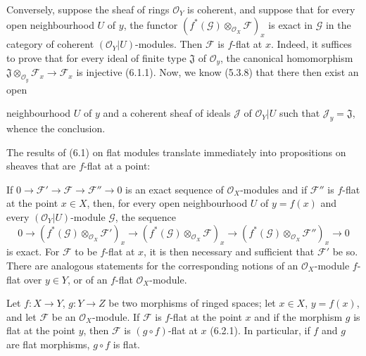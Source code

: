 \begin{env}[6.7.3]
\label{0.6.7.3}
Conversely, suppose the sheaf of rings $\mathcal O_Y$ is coherent, and
suppose that for every open neighbourhood $U$ of $y$, the functor
$(f^*(\mathcal G)\otimes_{\mathcal O_X}\mathcal F)_x$ is exact in
$\mathcal G$ in the category of coherent $(\mathcal O_Y|U)$-modules.
Then $\mathcal F$ is $f$-flat at $x$. Indeed, it suffices to prove that
for every ideal of finite type $\mathfrak J$ of $\mathcal O_y$,
the canonical homomorphism
$\mathfrak J\otimes_{\mathcal O_y}\mathcal F_x\to\mathcal F_x$ is injective
(6.1.1). Now, we know (5.3.8) that there then exist an open


neighbourhood $U$ of $y$ and a coherent sheaf of ideals $\mathcal J$ of
$\mathcal O_Y|U$ such that $\mathcal J_y=\mathfrak J$, whence the conclusion.
\end{env}

\begin{env}[6.7.4]
\label{0.6.7.4}
The results of (6.1) on flat modules translate immediately into
propositions on sheaves that are $f$-flat at a point:

If $0\to\mathcal F'\to\mathcal F\to\mathcal F''\to0$ is an exact sequence
of $\mathcal O_X$-modules and if $\mathcal F''$ is $f$-flat at the point
$x\in X$, then, for every open neighbourhood $U$ of $y=f(x)$ and every
$(\mathcal O_Y|U)$-module $\mathcal G$, the sequence
\[
  0\longrightarrow
  (f^*(\mathcal G)\otimes_{\mathcal O_X}\mathcal F')_x
  \longrightarrow
  (f^*(\mathcal G)\otimes_{\mathcal O_X}\mathcal F)_x
  \longrightarrow
  (f^*(\mathcal G)\otimes_{\mathcal O_X}\mathcal F'')_x
  \longrightarrow0
\]
is exact. For $\mathcal F$ to be $f$-flat at $x$, it is then necessary and sufficient
that $\mathcal F'$ be so. There are analogous statements for the
corresponding notions of an $\mathcal O_X$-module $f$-flat over $y\in Y$, or
of an $f$-flat $\mathcal O_X$-module.
\end{env}

\begin{env}[6.7.5]
\label{0.6.7.5}
Let $f:X\to Y$, $g:Y\to Z$ be two morphisms of ringed spaces; let
$x\in X$, $y=f(x)$, and let $\mathcal F$ be an $\mathcal O_X$-module. If $\mathcal F$
is $f$-flat at the point $x$ and if the morphism $g$ is flat at the point $y$, then
$\mathcal F$ is $(g\circ f)$-flat at $x$ (6.2.1). In particular, if $f$ and
$g$ are flat morphisms, $g\circ f$ is flat.
\end{env}

